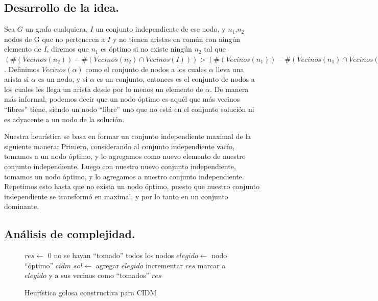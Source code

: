 \subsection{Desarrollo de la idea.}

\vspace*{0.3cm}

Sea $G$ un grafo cualquiera, $I$ un conjunto independiente de ese nodo, y $n_{1}$,$n_{2}$ nodos de G que no pertenecen a $I$ y no tienen aristas en común con ningún elemento de $I$, diremos que $n_{1}$ es óptimo si no existe ningún $n_{2}$ tal que $( \# (Vecinos(n_{2})) - \# (Vecinos(n_{2}) \cap Vecinos(I))) > ( \# (Vecinos(n_{1})) - \# (Vecinos(n_{1}) \cap Vecinos(I)))$. Definimos $Vecinos(\alpha)$ como el conjunto de nodos a los cuales $\alpha$ lleva una arista si $\alpha$ es un nodo, y si $\alpha$ es un conjunto, entonces es el conjunto de nodos a los cuales les llega un arista desde por lo menos un elemento de $\alpha$.  De manera más informal, podemos decir que un nodo óptimo es aquél que más vecinos ``libres'' tiene, siendo un nodo ``libre'' uno que no está en el conjunto solución ni es adyacente a un nodo de la solución.

Nuestra heurística se basa en formar un conjunto independiente maximal de la siguiente manera:
Primero, considerando al conjunto independiente vacío, tomamos a un nodo óptimo, y lo agregamos como nuevo elemento de nuestro conjunto independiente. Luego con nuestro nuevo conjunto independiente, tomamos un nodo óptimo, y lo agregamos a nuestro conjunto independiente. Repetimos esto hasta que no exista un nodo óptimo, puesto que nuestro conjunto independiente se transformó en maximal, y por lo tanto en un conjunto dominante.
 
\vspace*{0.6cm}


\subsection{Análisis de complejidad.}

\vspace*{0.3cm}

\begin{figure}
\begin{codebox}
\li $res \leftarrow$ 0
\li \While no se hayan ``tomado'' todos los nodos
\li 	\Do 
 		$elegido \leftarrow$ nodo ``óptimo''
\li 		$cidm\_sol \leftarrow$ agregar $elegido$
\li 		incrementar $res$
\li 		marcar a $elegido$ y a sus vecinos como ``tomados''
	\End
\li \Return $res$
\end{codebox}
\caption{Heurística golosa constructiva para CIDM}\label{code:goloso}
\end{figure}

